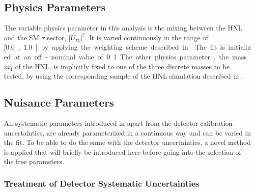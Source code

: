 \subsection{Physics Parameters} 

The variable physics parameter in this analysis is the mixing between the HNL and the SM $\tau$ sector, $|U_{\tau4}|^2$. It is varied continuously in the range of [\SI{0.0}, \SI{1.0}] by applying the weighting scheme described in . The fit is initialized at an off-nominal value of 0.1. The other physics parameter, the mass $m_4$ of the HNL, is implicitly fixed to one of the three discrete masses to be tested, by using the corresponding sample of the HNL simulation described in .


\subsection{Nuisance Parameters}

All systematic parameters introduced in  apart from the detector calibration uncertainties, are already parameterized in a continuous way and can be varied in the fit. To be able to do the same with the detector uncertainties, a novel method is applied that will briefly be introduced here before going into the selection of the free parameters.


\subsubsection{Treatment of Detector Systematic Uncertainties} 

